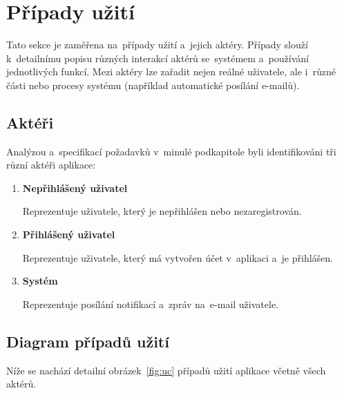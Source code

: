 \documentclass[twoside]{ctuthesis}
\begin{document}
\section{Případy užití}

Tato sekce je zaměřena na~případy užití a~jejich aktéry. Případy slouží k~detailnímu popisu různých interakcí aktérů se~systémem a~používání jednotlivých funkcí. Mezi aktéry lze zařadit nejen reálné uživatele, ale i~různé části nebo procesy systému (například automatické posílání e-mailů).%

\subsection{Aktéři}

Analýzou a~specifikací požadavků v~minulé podkapitole byli identifikováni tři různí aktéři aplikace:
\begin{enumerate}
\item \textbf{Nepřihlášený uživatel}

Reprezentuje uživatele, který je nepřihlášen nebo nezaregistrován.

\item \textbf{Přihlášený uživatel}

Reprezentuje uživatele, který má vytvořen účet v~aplikaci a~je přihlášen.

\item \textbf{Systém}

Reprezentuje posílání notifikací a~zpráv na~e-mail uživatele.
\end{enumerate}

\newpage

\subsection{Diagram případů užití}

Níže se nachází detailní obrázek~\ref{fig:uc} případů užití aplikace včetně všech aktérů.
\end{document}
